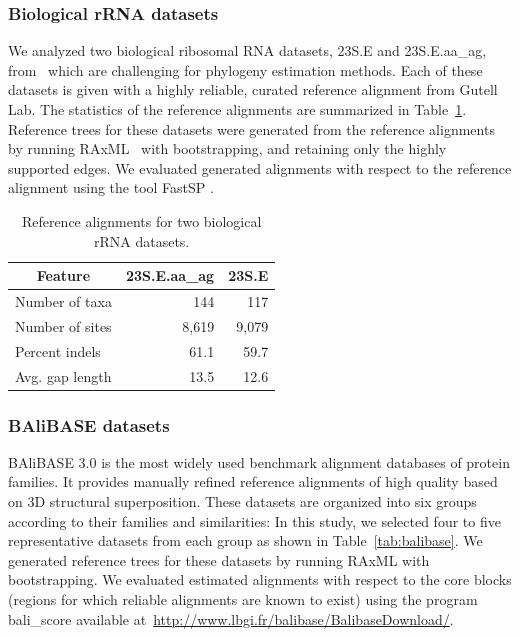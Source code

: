 \subsubsection{Biological rRNA datasets}
We analyzed two biological ribosomal RNA datasets, 23S.E and 23S.E.aa\_ag, from~\citealp{liu2009rapid} which are challenging for phylogeny estimation methods. Each of these datasets is given with a highly reliable, curated reference alignment from Gutell Lab. The statistics of the reference alignments are summarized in Table~\ref{tab:bio_stat}. Reference trees for these datasets were generated from the reference alignments by running RAxML~\citep{stamatakis2014raxml} with bootstrapping, and retaining only the highly supported edges. We evaluated generated alignments with respect to the reference alignment using the tool FastSP \citep{mirarab2011fastsp}.

\begin{table}[htbp]
	\small
	\centering
	\caption{Reference alignments for two biological rRNA datasets.}
	\begin{tabular}{|l|r|r|}
		\hline
		\multicolumn{1}{|c|}{Feature} & \multicolumn{1}{c|}{23S.E.aa\_ag} & \multicolumn{1}{c|}{23S.E} \\
		\hline
		Number of taxa & 144   & 117 \\
		\hline
		Number of sites & 8,619 & 9,079 \\
		\hline
		Percent indels & 61.1  & 59.7 \\
		\hline
		Avg. gap length & 13.5  & 12.6 \\
		\hline
	\end{tabular}%
	\label{tab:bio_stat}%
\end{table}%

\subsubsection{BAliBASE datasets}
BAliBASE 3.0 \citep{thompson2005balibase} is the most widely used benchmark alignment databases of protein families. It provides manually refined reference alignments of high quality based on 3D structural superposition. These datasets are organized into six groups according to their families and similarities:  In this study, we selected four to five representative datasets from each group as shown in Table~\ref{tab:balibase}. We generated reference trees for these datasets by running RAxML with bootstrapping. We evaluated estimated alignments with respect to the core blocks (regions for which reliable alignments are known to exist) using the program bali\_score available at~\url{http://www.lbgi.fr/balibase/BalibaseDownload/}.

